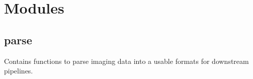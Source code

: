 \documentclass[a4paper,10pt,english,openany,oneside]{sphinxmanual}
\begin{document}
\sphinxstepscope


\chapter{Modules}
\label{\detokenize{pages/modules:module-sparcstools.parse}}\label{\detokenize{pages/modules:modules}}\label{\detokenize{pages/modules::doc}}

\section{parse}
\label{\detokenize{pages/modules:parse}}
\sphinxAtStartPar
Contains functions to parse imaging data into a usable formats for downstream pipelines.
\end{document}
